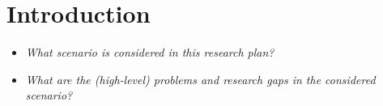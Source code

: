 \section{Introduction}
\label{sec:Introduction}


\begin{itemize}
	\item \emph{What scenario is considered in this research plan?}
    \item \emph{What are the (high-level) problems and research gaps in the considered scenario?}
\end{itemize}